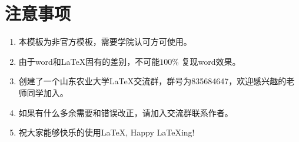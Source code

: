 \chapter{注意事项}

\begin{enumerate}
	\item 本模板为非官方模板，需要学院认可方可使用。
	\item 由于word和\LaTeX 固有的差别，不可能$100$\% 复现word效果。
	\item 创建了一个山东农业大学\LaTeX 交流群，群号为835684647，欢迎感兴趣的老师同学加入。
	\item 如果有什么多余需要和错误改正，请加入交流群联系作者。
	\item 祝大家能够快乐的使用\LaTeX , Happy \LaTeX ing!
\end{enumerate}